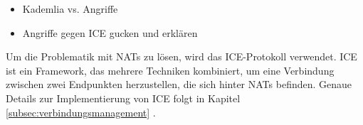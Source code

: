\begin{itemize}
    \item Kademlia vs. Angriffe
    \item Angriffe gegen ICE gucken und erklären
\end{itemize}

Um die Problematik mit NATs zu lösen, wird das ICE-Protokoll verwendet. ICE ist ein Framework, das mehrere Techniken kombiniert, um eine Verbindung zwischen zwei Endpunkten herzustellen, die sich hinter NATs befinden. Genaue Details zur Implementierung von ICE folgt in Kapitel \ref{subsec:verbindungsmanagement} \textit{}.


